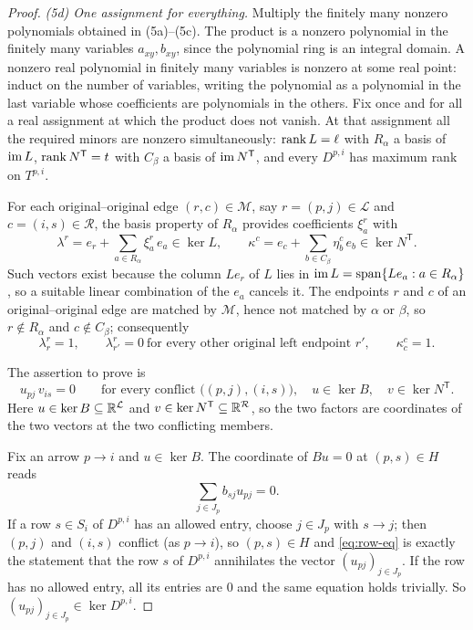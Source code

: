 \begin{proof}
\emph{(5d) One assignment for everything.} Multiply the finitely many nonzero polynomials obtained in
(5a)--(5c). The product is a nonzero polynomial in the finitely many variables $a_{xy},b_{xy}$, since
the polynomial ring is an integral domain. A nonzero real polynomial in finitely many variables is
nonzero at some real point: induct on the number of variables, writing the polynomial as a polynomial
in the last variable whose coefficients are polynomials in the others. Fix once and for all a real
assignment at which the product does not vanish. At that assignment all the required minors are
nonzero simultaneously: $\operatorname{rank} L=\ell$ with $R_\alpha$ a basis of $\operatorname{im} L$, $\operatorname{rank} N^{\mathsf T}=t$
with $C_\beta$ a basis of $\operatorname{im} N^{\mathsf T}$, and every $D^{p,i}$ has maximum rank on $T^{p,i}$.

For each original--original edge $(r,c)\in\mathcal M$, say $r=(p,j)\in\mathcal L$ and
$c=(i,s)\in\mathcal R$, the basis property of $R_\alpha$ provides coefficients $\xi^r_a$ with
\begin{equation}\label{eq:lifts}
 \lambda^r=e_r+\sum_{a\in R_\alpha}\xi^r_a\,e_a\in\ker L,
 \qquad
 \kappa^c=e_c+\sum_{b\in C_\beta}\eta^c_b\,e_b\in\ker N^{\mathsf T}.
\end{equation}
Such vectors exist because the column $Le_r$ of $L$ lies in $\operatorname{im} L=\operatorname{span}\{Le_a:a\in R_\alpha\}$, so a
suitable linear combination of the $e_a$ cancels it. The endpoints $r$ and $c$ of an
original--original edge are matched by $\mathcal M$, hence not matched by $\alpha$ or $\beta$, so
$r\notin R_\alpha$ and $c\notin C_\beta$; consequently
\[
 \lambda^r_r=1,\qquad \lambda^r_{r'}=0\ \text{for every other original left endpoint }r',
 \qquad \kappa^c_c=1 .
\]

The assertion to prove is
\begin{equation}\label{eq:key}
 u_{pj}\,v_{is}=0
 \qquad\text{for every conflict }\bigl((p,j),(i,s)\bigr),\quad
 u\in\ker B,\quad v\in\ker N^{\mathsf T}.
\end{equation}
Here $u\in\ker B\subseteq\mathbb R^{\mathcal L}$ and $v\in\ker N^{\mathsf T}\subseteq\mathbb R^{\mathcal R}$, so
the two factors are coordinates of the two vectors at the two conflicting members.

Fix an arrow $p\to i$ and $u\in\ker B$. The coordinate of $Bu=0$ at $(p,s)\in H$ reads
\begin{equation}\label{eq:row-eq}
 \sum_{j\in J_p}b_{sj}u_{pj}=0 .
\end{equation}
If a row $s\in S_i$ of $D^{p,i}$ has an allowed entry, choose $j\in J_p$ with $s\to j$; then $(p,j)$
and $(i,s)$ conflict (as $p\to i$), so $(p,s)\in H$ and \eqref{eq:row-eq} is exactly the statement
that the row $s$ of $D^{p,i}$ annihilates the vector $(u_{pj})_{j\in J_p}$. If the row has no allowed
entry, all its entries are $0$ and the same equation holds trivially. So
$(u_{pj})_{j\in J_p}\in\ker D^{p,i}$.


\end{proof}
